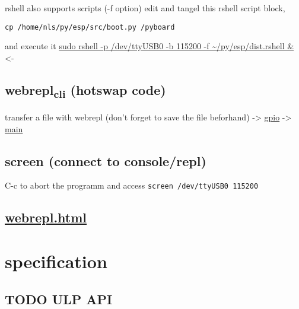 \documentclass[11pt]{article}
\begin{document}
rshell also supports scripts (-f option)
edit and tangel this rshell script block,
\begin{verbatim}
cp /home/nls/py/esp/src/boot.py /pyboard
\end{verbatim}
and execute it
\url{sudo rshell -p /dev/ttyUSB0 -b 115200 -f \~/py/esp/dist.rshell \&} <-
\subsection{webrepl\textsubscript{cli} (hotswap code)}
\label{sec:orgabadcfb}
transfer a file with webrepl (don't forget to save the file beforhand)
-> \href{ /home/\$USER/py/esp/webrepl/webrepl\_cli.py -p "" \~/py/esp/src/gpio.py 192.168.43.31:/gpio.py \&}{gpio}
-> \href{ /home/\$USER/py/esp/webrepl/webrepl\_cli.py -p "" \~/py/esp/src/main.py 192.168.43.31:/main.py \&}{main}

\subsection{screen (connect to console/repl)}
\label{sec:org2247898}
C-c to abort the programm and access
\texttt{screen /dev/ttyUSB0 115200}

\subsection{\href{file:///home/nls/py/esp/webrepl/webrepl.html}{webrepl.html}}
\label{sec:org37adaf0}

\section{specification}
\label{sec:orgbfb2e7b}
\subsection{{\bfseries\sffamily TODO} ULP API}
\label{sec:org785fdae}
\end{document}
